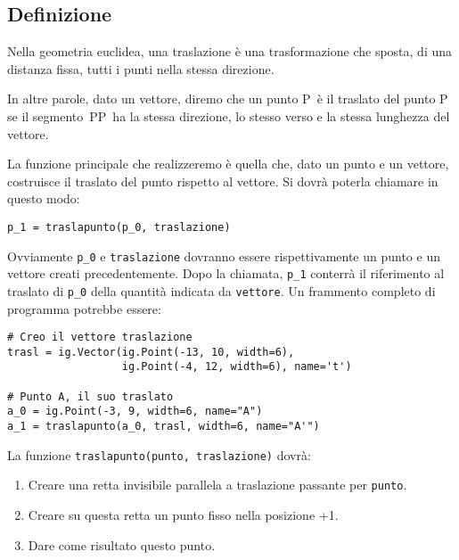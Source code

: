 \def \tqs{\textquotesingle~}


\subsection{Definizione}

Nella geometria euclidea, una traslazione è una trasformazione che sposta,
di una distanza fissa, tutti i punti nella stessa direzione.

In altre parole, dato un vettore, diremo che un punto P\tqs è il 
traslato del
punto P se il segmento~PP\tqs ha la 
stessa direzione, lo stesso verso e la stessa
lunghezza del vettore.

La funzione principale che realizzeremo è quella che, dato un punto e
un vettore, costruisce il traslato del punto rispetto al vettore.
Si dovrà poterla chiamare in questo modo:

\begin{lstlisting}
p_1 = traslapunto(p_0, traslazione)
\end{lstlisting}

Ovviamente \lstinline{p_0} e \lstinline{traslazione} 
dovranno essere rispettivamente un punto e un vettore creati precedentemente.
Dopo la chiamata, \lstinline{p_1} conterrà il riferimento al traslato di 
\lstinline{p_0} della quantità indicata da \lstinline{vettore}.
Un frammento completo di programma potrebbe essere:

\begin{lstlisting}
# Creo il vettore traslazione
trasl = ig.Vector(ig.Point(-13, 10, width=6),
                  ig.Point(-4, 12, width=6), name='t')

# Punto A, il suo traslato
a_0 = ig.Point(-3, 9, width=6, name="A")
a_1 = traslapunto(a_0, trasl, width=6, name="A'")
\end{lstlisting}

\noindent La funzione \lstinline{traslapunto(punto, traslazione)} dovrà:

\begin{enumerate} [noitemsep]
\item Creare una retta invisibile parallela a {\ttfamily traslazione}
passante per \lstinline{punto}.
\item Creare su questa retta un punto fisso nella posizione +1.
\item Dare come risultato questo punto.
\end{enumerate}

